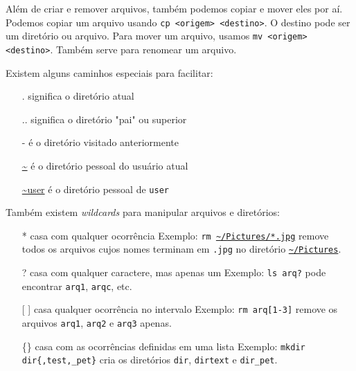 \documentclass{beamer}
\begin{document}
\begin{frame}

	Além de criar e remover arquivos, também podemos copiar e mover eles por aí.
	\newline
	\newline
	Podemos copiar um arquivo usando \texttt{cp <origem> <destino>}. O destino
	pode ser um diretório ou arquivo.
	\newline
	\newline
	Para mover um arquivo, usamos \texttt{mv <origem> <destino>}. Também serve
	para renomear um arquivo.

\end{frame}

\begin{frame}

	Existem alguns caminhos especiais para facilitar:

	\begin{itemize}
		\item[.] significa o diretório atual
		\item[..] significa o diretório "pai" ou superior
		\item[-] é o diretório visitado anteriormente
		\item[\url{~}] é o diretório pessoal do usuário atual
		\item[\url{~user}] é o diretório pessoal de \texttt{user}
	\end{itemize}

\end{frame}

\begin{frame}

	Também existem \textit{wildcards} para manipular arquivos e diretórios:

	\begin{itemize}
		\item[*] casa com qualquer ocorrência
			\newline
			Exemplo: \texttt{rm \url{~/Pictures/*.jpg}} remove todos os arquivos cujos nomes
			terminam em \texttt{.jpg} no diretório \texttt{\url{~/Pictures}}.
		\item[?] casa com qualquer caractere, mas apenas um
			\newline
			Exemplo: \texttt{ls arq?} pode encontrar \texttt{arq1}, \texttt{arqc}, etc.
		\item[{[ ]}] casa qualquer ocorrência no intervalo
			\newline
			Exemplo: \texttt{rm arq[1-3]} remove os arquivos \texttt{arq1},
			\texttt{arq2} e \texttt{arq3} apenas.
		\item[\{\}] casa com as ocorrências definidas em uma lista
			\newline
			Exemplo: \texttt{mkdir dir\{,test,\_pet\}} cria os diretórios \texttt{dir},
			\texttt{dirtext} e \texttt{dir\_pet}.
	\end{itemize}

\end{frame}
\end{document}
